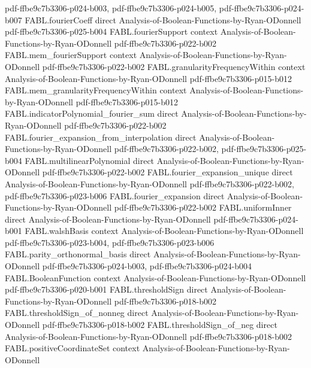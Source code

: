 \begin{theorem}
  {pdf-ffbe9c7b3306-p024-b003,
    pdf-ffbe9c7b3306-p024-b005,
    pdf-ffbe9c7b3306-p024-b007}
\proofstep
  {FABL.fourierCoeff}
  {direct}
  {Analysis-of-Boolean-Functions-by-Ryan-ODonnell}
  {pdf-ffbe9c7b3306-p025-b004}
\proofstep
  {FABL.fourierSupport}
  {context}
  {Analysis-of-Boolean-Functions-by-Ryan-ODonnell}
  {pdf-ffbe9c7b3306-p022-b002}
\proofstep
  {FABL.mem_fourierSupport}
  {context}
  {Analysis-of-Boolean-Functions-by-Ryan-ODonnell}
  {pdf-ffbe9c7b3306-p022-b002}
\proofstep
  {FABL.granularityFrequencyWithin}
  {context}
  {Analysis-of-Boolean-Functions-by-Ryan-ODonnell}
  {pdf-ffbe9c7b3306-p015-b012}
\proofstep
  {FABL.mem_granularityFrequencyWithin}
  {context}
  {Analysis-of-Boolean-Functions-by-Ryan-ODonnell}
  {pdf-ffbe9c7b3306-p015-b012}
\proofstep
  {FABL.indicatorPolynomial_fourier_sum}
  {direct}
  {Analysis-of-Boolean-Functions-by-Ryan-ODonnell}
  {pdf-ffbe9c7b3306-p022-b002}
\proofstep
  {FABL.fourier_expansion_from_interpolation}
  {direct}
  {Analysis-of-Boolean-Functions-by-Ryan-ODonnell}
  {pdf-ffbe9c7b3306-p022-b002,
    pdf-ffbe9c7b3306-p025-b004}
\proofstep
  {FABL.multilinearPolynomial}
  {direct}
  {Analysis-of-Boolean-Functions-by-Ryan-ODonnell}
  {pdf-ffbe9c7b3306-p022-b002}
\proofstep
  {FABL.fourier_expansion_unique}
  {direct}
  {Analysis-of-Boolean-Functions-by-Ryan-ODonnell}
  {pdf-ffbe9c7b3306-p022-b002,
    pdf-ffbe9c7b3306-p023-b006}
\proofstep
  {FABL.fourier_expansion}
  {direct}
  {Analysis-of-Boolean-Functions-by-Ryan-ODonnell}
  {pdf-ffbe9c7b3306-p022-b002}
\proofstep
  {FABL.uniformInner}
  {direct}
  {Analysis-of-Boolean-Functions-by-Ryan-ODonnell}
  {pdf-ffbe9c7b3306-p024-b001}
\proofstep
  {FABL.walshBasis}
  {context}
  {Analysis-of-Boolean-Functions-by-Ryan-ODonnell}
  {pdf-ffbe9c7b3306-p023-b004,
    pdf-ffbe9c7b3306-p023-b006}
\proofstep
  {FABL.parity_orthonormal_basis}
  {direct}
  {Analysis-of-Boolean-Functions-by-Ryan-ODonnell}
  {pdf-ffbe9c7b3306-p024-b003,
    pdf-ffbe9c7b3306-p024-b004}
\proofstep
  {FABL.BooleanFunction}
  {context}
  {Analysis-of-Boolean-Functions-by-Ryan-ODonnell}
  {pdf-ffbe9c7b3306-p020-b001}
\proofstep
  {FABL.thresholdSign}
  {direct}
  {Analysis-of-Boolean-Functions-by-Ryan-ODonnell}
  {pdf-ffbe9c7b3306-p018-b002}
\proofstep
  {FABL.thresholdSign_of_nonneg}
  {direct}
  {Analysis-of-Boolean-Functions-by-Ryan-ODonnell}
  {pdf-ffbe9c7b3306-p018-b002}
\proofstep
  {FABL.thresholdSign_of_neg}
  {direct}
  {Analysis-of-Boolean-Functions-by-Ryan-ODonnell}
  {pdf-ffbe9c7b3306-p018-b002}
\proofstep
  {FABL.positiveCoordinateSet}
  {context}
  {Analysis-of-Boolean-Functions-by-Ryan-ODonnell}

\end{theorem}

